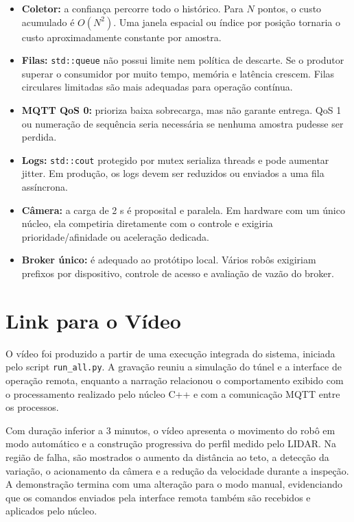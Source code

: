 \documentclass[12pt,a4paper]{article}
\begin{document}
\begin{itemize}
    \item \textbf{Coletor:} a confiança percorre todo o histórico. Para $N$ pontos, o custo acumulado é $O(N^2)$. Uma janela espacial ou índice por posição tornaria o custo aproximadamente constante por amostra.
    \item \textbf{Filas:} \texttt{std::queue} não possui limite nem política de descarte. Se o produtor superar o consumidor por muito tempo, memória e latência crescem. Filas circulares limitadas são mais adequadas para operação contínua.
    \item \textbf{MQTT QoS 0:} prioriza baixa sobrecarga, mas não garante entrega. QoS 1 ou numeração de sequência seria necessária se nenhuma amostra pudesse ser perdida.
    \item \textbf{Logs:} \texttt{std::cout} protegido por mutex serializa threads e pode aumentar jitter. Em produção, os logs devem ser reduzidos ou enviados a uma fila assíncrona.
    \item \textbf{Câmera:} a carga de 2 s é proposital e paralela. Em hardware com um único núcleo, ela competiria diretamente com o controle e exigiria prioridade/afinidade ou aceleração dedicada.
    \item \textbf{Broker único:} é adequado ao protótipo local. Vários robôs exigiriam prefixos por dispositivo, controle de acesso e avaliação de vazão do broker.
\end{itemize}

\section{Link para o Vídeo}

O vídeo foi produzido a partir de uma execução integrada do sistema, iniciada pelo script \texttt{run\_all.py}. A gravação reuniu a simulação do túnel e a interface de operação remota, enquanto a narração relacionou o comportamento exibido com o processamento realizado pelo núcleo C++ e com a comunicação MQTT entre os processos.

Com duração inferior a 3 minutos, o vídeo apresenta o movimento do robô em modo automático e a construção progressiva do perfil medido pelo LIDAR. Na região de falha, são mostrados o aumento da distância ao teto, a detecção da variação, o acionamento da câmera e a redução da velocidade durante a inspeção. A demonstração termina com uma alteração para o modo manual, evidenciando que os comandos enviados pela interface remota também são recebidos e aplicados pelo núcleo.
\end{document}
